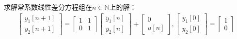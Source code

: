 \begin{example}
    求解常系数线性差分方程组在$n\in\mathbb{N}$上的解：
    \begin{align*}
        \begin{bmatrix}
            y_1[n+1]\\
            y_2[n+1]
        \end{bmatrix}=\begin{bmatrix}
            1 & 1\\
            0 & 1
        \end{bmatrix}
        \begin{bmatrix}
            y_1[n]\\
            y_2[n]
        \end{bmatrix} + \begin{bmatrix}
            0\\
            u[n]
        \end{bmatrix},\begin{bmatrix}
            y_1[0]\\
            y_2[0]
        \end{bmatrix} = \begin{bmatrix}
            1\\
            0
        \end{bmatrix}
    \end{align*}


\end{example}
